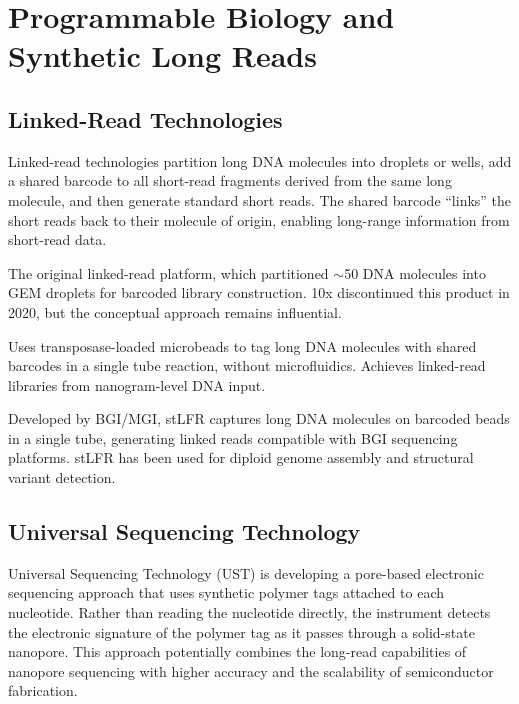 \section{Programmable Biology and Synthetic Long Reads}
\label{sec:emerging:synthetic-long-reads}

\subsection{Linked-Read Technologies}
\label{subsec:emerging:linked-reads}

Linked-read technologies partition long DNA molecules into droplets or wells, add a shared barcode to all short-read fragments derived from the same long molecule, and then generate standard short reads. The shared barcode ``links'' the short reads back to their molecule of origin, enabling long-range information from short-read data.

\begin{description}[style=nextline, itemsep=3pt]
  \item[10x Genomics Chromium Genome (deprecated)] The original linked-read platform, which partitioned $\sim$50\kilobase{} DNA molecules into GEM droplets for barcoded library construction. 10x discontinued this product in 2020, but the conceptual approach remains influential.

  \item[TELL-seq (Transposase Enzyme Linked Long-read Sequencing)] Uses transposase-loaded microbeads to tag long DNA molecules with shared barcodes in a single tube reaction, without microfluidics. Achieves linked-read libraries from nanogram-level DNA input.

  \item[stLFR (Single-Tube Long Fragment Read)] Developed by BGI/MGI, stLFR captures long DNA molecules on barcoded beads in a single tube, generating linked reads compatible with BGI sequencing platforms. stLFR has been used for diploid genome assembly and structural variant detection.
\end{description}

\subsection{Universal Sequencing Technology}
\label{subsec:emerging:ust}

Universal Sequencing Technology (UST) is developing a pore-based electronic sequencing approach that uses synthetic polymer tags attached to each nucleotide. Rather than reading the nucleotide directly, the instrument detects the electronic signature of the polymer tag as it passes through a solid-state nanopore. This approach potentially combines the long-read capabilities of nanopore sequencing with higher accuracy and the scalability of semiconductor fabrication.


